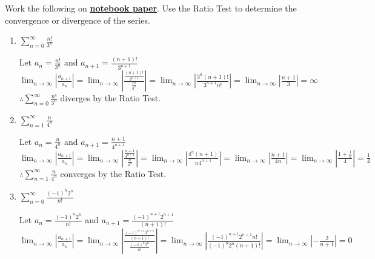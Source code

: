 \documentclass[10pt,letterpaper]{report}
\begin{document}
\noindent Work the following on \textbf{\underline{notebook paper}}.
\noindent Use the Ratio Test to determine the convergence or divergence of the series.
\begin{enumerate}
  \item{$\sum_{n=0}^{\infty}{\frac{n!}{3^{n}}}$ \\}

    Let $a_{n}=\frac{n!}{3^{n}}$ and $a_{n+1}=\frac{(n+1)!}{3^{n+1}}$ \\

    $\lim_{n\to\infty}{\left|\frac{a_{n+1}}{a_{n}}\right|}=
    \lim_{n\to\infty}{\left|\frac{\frac{(n+1)!}{3^{n+1}}}{\frac{n!}{3^{n}}}\right|}=
    \lim_{n\to\infty}{\left|\frac{3^{n}(n+1)!}{3^{n+1}n!}\right|}=
    \lim_{n\to\infty}{\left|\frac{n+1}{3}\right|}=\infty$ \\

    $\therefore \sum_{n=0}^{\infty}{\frac{n!}{3^{n}}}$ diverges by the Ratio Test. \\

  \item{$\sum_{n=1}^{\infty}{\frac{n}{4^{n}}}$ \\}

    Let $a_{n}=\frac{n}{4^{n}}$ and $a_{n+1}=\frac{n+1}{4^{n+1}}$ \\

    $\lim_{n\to\infty}{\left|\frac{a_{n+1}}{a_{n}}\right|}=
    \lim_{n\to\infty}{\left|\frac{\frac{n+1}{4^{n+1}}}{\frac{n}{4^{n}}}\right|}=
    \lim_{n\to\infty}{\left|\frac{4^{n}(n+1)}{n4^{n+1}}\right|}=
    \lim_{n\to\infty}{\left|\frac{n+1}{4n}\right|}=
    \lim_{n\to\infty}{\left|\frac{1+\frac{1}{n}}{4}\right|}=\frac{1}{4}$ \\

    $\therefore \sum_{n=1}^{\infty}{\frac{n}{4^{n}}}$ converges by the Ratio Test. \\

  \item{$\sum_{n=0}^{\infty}{\frac{(-1)^{n}2^{n}}{n!}}$ \\}

    Let $a_{n}=\frac{(-1)^{n}2^{n}}{n!}$ and $a_{n+1}=\frac{(-1)^{n+1}2^{n+1}}{(n+1)!}$ \\

    $\lim_{n\to\infty}{\left|\frac{a_{n+1}}{a_{n}}\right|}=
    \lim_{n\to\infty}{\left|\frac{\frac{(-1)^{n+1}2^{n+1}}{(n+1)!}}{\frac{(-1)^{n}2^{n}}{n!}}\right|}=
    \lim_{n\to\infty}{\left|\frac{(-1)^{n+1}2^{n+1}n!}{(-1)^{n}2^{n}(n+1)!}\right|}=
    \lim_{n\to\infty}{\left|-\frac{2}{n+1}\right|}=0$ \\


\end{enumerate}
\end{document}
